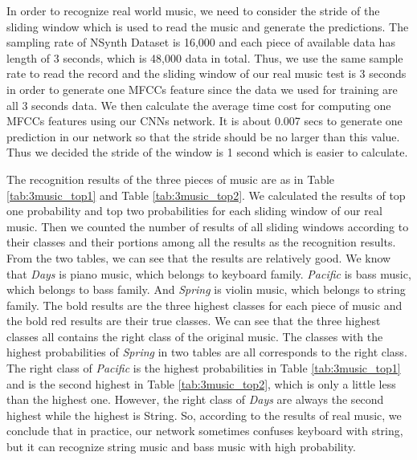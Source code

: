 \documentclass{article}
\begin{document}
\noindent In order to recognize real world music, we need to consider the stride of the sliding window which is used to read the music and generate the predictions. The sampling rate of NSynth Dataset is 16,000 and each piece of available data has length of 3 seconds, which is 48,000 data in total. Thus, we use the same sample rate to read the record and the sliding window of our real music test is 3 seconds in order to generate one MFCCs feature since the data we used for training are all 3 seconds data. We then calculate the average time cost for computing one MFCCs features using our CNNs network. It is about 0.007 secs to generate one prediction in our network so that the stride should be no larger than this value. Thus we decided the stride of the window is 1 second which is easier to calculate.

\noindent The recognition results of the three pieces of music are as in Table \ref{tab:3music_top1} and Table \ref{tab:3music_top2}. We calculated the results of top one probability and top two probabilities for each sliding window of our real music. Then we counted the number of results of all sliding windows according to their classes and their portions among all the results as the recognition results. From the two tables, we can see that the results are relatively good. We know that \emph{Days} is piano music, which belongs to keyboard family. \emph{Pacific} is bass music, which belongs to bass family. And \emph{Spring} is violin music, which belongs to string family. The bold results are the three highest classes for each piece of music and the bold red results are their true classes. We can see that the three highest classes all contains the right class of the original music. The classes with the highest probabilities of \emph{Spring} in two tables are all corresponds to the right class. The right class of \emph{Pacific} is the highest probabilities in Table \ref{tab:3music_top1} and is the second highest in Table \ref{tab:3music_top2}, which is only a little less than the highest one. However, the right class of \emph{Days} are always the second highest while the highest is String. So, according to the results of real music, we conclude that in practice, our network sometimes confuses keyboard with string, but it can recognize string music and bass music with high probability.

\end{document}
